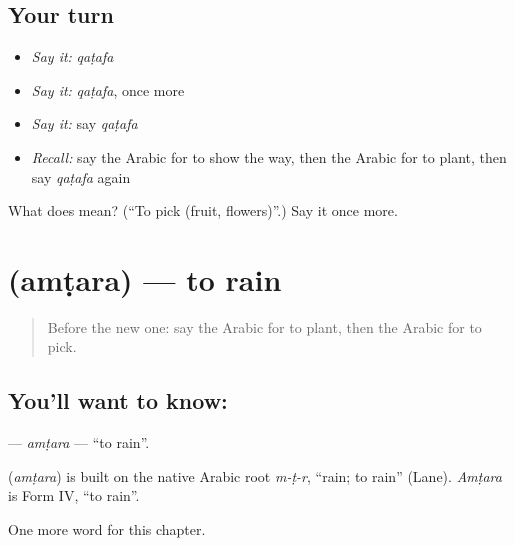 \subsection*{Your turn}
\begin{itemize}
\raggedright
  \item \emph{Say it:} \emph{qaṭafa}
  \item \emph{Say it:} \emph{qaṭafa}, once more
  \item \emph{Say it:} say \emph{qaṭafa}
  \item \emph{Recall:} say the Arabic for to show the way, then the Arabic for to plant, then say \emph{qaṭafa} again
\end{itemize}

\begin{tcolorbox}[breakable,colback=teal!4,colframe=teal!35!black,title={Before you move on}]
What does  mean? (\textquotedblleft{}To pick (fruit, flowers)\textquotedblright{}.) Say it once more.
\end{tcolorbox}
\section[\texorpdfstring{\ar{أمطر} (amṭara)}{أمطر (amṭara)}]{ (amṭara) — to rain}

\label{lesson:AR-C196-amtara}



\begin{quote}
Before the new one: say the Arabic for to plant, then the Arabic for to pick.
\end{quote}

\subsection*{You'll want to know: }
\textbf{} — \emph{amṭara} — \textquotedblleft{}to rain\textquotedblright{}.

\begin{cousinweb}
\textbf{} (\emph{amṭara}) is built on the native Arabic root \emph{m-ṭ-r}, \textquotedblleft{}rain; to rain\textquotedblright{} (Lane). \emph{Amṭara} is Form IV, \textquotedblleft{}to rain\textquotedblright{}.
\end{cousinweb}

\begin{grammarlens}[title={What you've built}]
One more word for this chapter.
\end{grammarlens}


